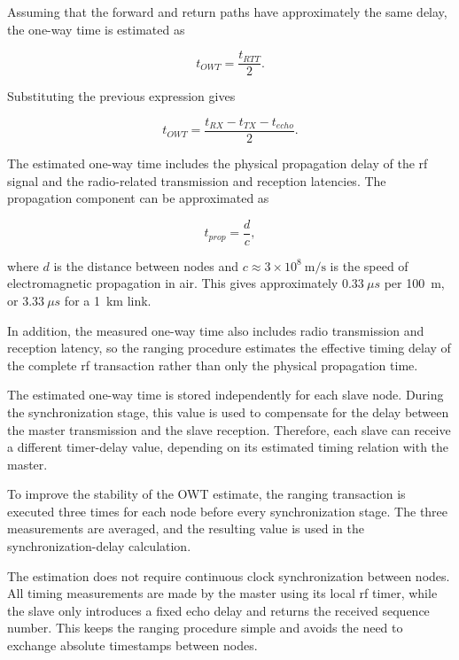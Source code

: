 Assuming that the forward and return paths have approximately the same delay, the one-way time is estimated as

\begin{equation}
    t_{OWT} = \frac{t_{RTT}}{2}.
\end{equation}

Substituting the previous expression gives

\begin{equation}
    t_{OWT} = \frac{t_{RX} - t_{TX} - t_{echo}}{2}.
\end{equation}


The estimated one-way time includes the physical propagation delay of the \acrshort{rf} signal and the radio-related transmission and reception latencies. The propagation component can be approximated as

\begin{equation}
    t_{prop} = \frac{d}{c},
\end{equation}

where $d$ is the distance between nodes and $c \approx 3 \times 10^8~\mathrm{m/s}$ is the speed of electromagnetic propagation in air. This gives approximately $0.33~\mu s$ per 100~m, or $3.33~\mu s$ for a 1~km link.

In addition, the measured one-way time also includes radio transmission and reception latency, so the ranging procedure estimates the effective timing delay of the complete \acrshort{rf} transaction rather than only the physical propagation time.

The estimated one-way time is stored independently for each slave node. During the synchronization stage, this value is used to compensate for the delay between the master transmission and the slave reception. Therefore, each slave can receive a different timer-delay value, depending on its estimated timing relation with the master.

To improve the stability of the OWT estimate, the ranging transaction is executed three times for each node before every synchronization stage. The three measurements are averaged, and the resulting value is used in the synchronization-delay calculation.
 
The estimation does not require continuous clock synchronization between nodes. All timing measurements are made by the master using its local \acrshort{rf} timer, while the slave only introduces a fixed echo delay and returns the received sequence number. This keeps the ranging procedure simple and avoids the need to exchange absolute timestamps between nodes.



